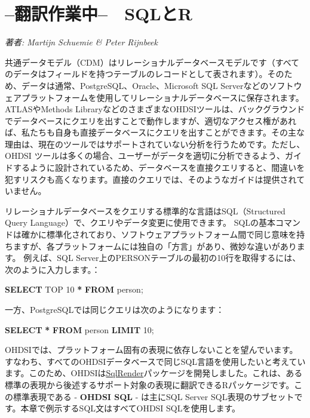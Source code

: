 \documentclass[
  11pt]{book}
\newenvironment{Shaded}{\begin{snugshade}}{\end{snugshade}}
\newcommand{\DecValTok}[1]{\textcolor[rgb]{0.00,0.00,0.81}{#1}}
\newcommand{\KeywordTok}[1]{\textcolor[rgb]{0.13,0.29,0.53}{\textbf{#1}}}
\newcommand{\NormalTok}[1]{#1}
\newcommand{\OperatorTok}[1]{\textcolor[rgb]{0.81,0.36,0.00}{\textbf{#1}}}
\theoremstyle{definition}
\theoremstyle{definition}
\theoremstyle{definition}
\theoremstyle{definition}
\theoremstyle{remark}
\begin{document}
\chapter{--翻訳作業中--　SQLとR}\label{SqlAndR}

\emph{著者: Martijn Schuemie \& Peter Rijnbeek}

共通データモデル（CDM）はリレーショナルデータベースモデルです（すべてのデータはフィールドを持つテーブルのレコードとして表されます）。そのため、データは通常、PostgreSQL、Oracle、Microsoft SQL Serverなどのソフトウェアプラットフォームを使用してリレーショナルデータベースに保存されます。ATLASやMethods LibraryなどのさまざまなOHDSIツールは、バックグラウンドでデータベースにクエリを出すことで動作しますが、適切なアクセス権があれば、私たちも自身も直接データベースにクエリを出すことができます。その主な理由は、現在のツールではサポートされていない分析を行うためです。ただし、OHDSI ツールは多くの場合、ユーザーがデータを適切に分析できるよう、ガイドするように設計されているため、データベースを直接クエリすると、間違いを犯すリスクも高くなります。直接のクエリでは、そのようなガイドは提供されていません。

リレーショナルデータベースをクエリする標準的な言語はSQL（Structured Query Language）で、クエリやデータ変更に使用できます。 SQLの基本コマンドは確かに標準化されており、ソフトウェアプラットフォーム間で同じ意味を持ちますが、各プラットフォームには独自の「方言」があり、微妙な違いがあります。 例えば、SQL Server上のPERSONテーブルの最初の10行を取得するには、次のように入力します。：  

\begin{Shaded}
\begin{Highlighting}[]
\KeywordTok{SELECT}\NormalTok{ TOP }\DecValTok{10} \OperatorTok{*} \KeywordTok{FROM}\NormalTok{ person;}
\end{Highlighting}
\end{Shaded}

一方、PostgreSQLでは同じクエリは次のようになります：

\begin{Shaded}
\begin{Highlighting}[]
\KeywordTok{SELECT} \OperatorTok{*} \KeywordTok{FROM}\NormalTok{ person }\KeywordTok{LIMIT} \DecValTok{10}\NormalTok{;}
\end{Highlighting}
\end{Shaded}

OHDSIでは、プラットフォーム固有の表現に依存しないことを望んでいます。すなわち、すべてのOHDSIデータベースで同じSQL言語を使用したいと考えています。このため、OHDSIは\href{https://ohdsi.github.io/SqlRender/}{SqlRender}パッケージを開発しました。これは、ある標準の表現から後述するサポート対象の表現に翻訳できるRパッケージです。この標準表現である - \textbf{OHDSI SQL} - は主にSQL Server SQL表現のサブセットです。本章で例示するSQL文はすべてOHDSI SQLを使用します。    
\end{document}
